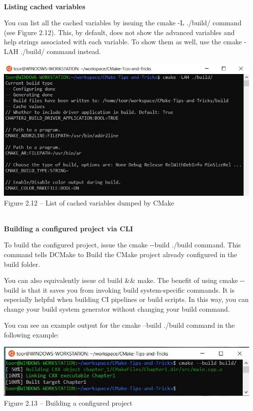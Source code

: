 \hspace*{\fill} \\ %
\noindent
\textbf{Listing cached variables}

You can list all the cached variables by issuing the cmake -L ./build/ command (see Figure 2.12). This, by default, does not show the advanced variables and help strings associated with each variable. To show them as well, use the cmake -LAH ./build/ command instead.

\begin{center}
\includegraphics[width=1.\textwidth]{content/1/chapter2/images/12.jpg}\\
Figure 2.12 – List of cached variables dumped by CMake
\end{center}

\hspace*{\fill} \\ %
\noindent
\textbf{Building a configured project via CLI}

To build the configured project, issue the cmake -{}-build ./build command. This command tells DCMake to Build the CMake project already configured in the build folder.

You can also equivalently issue cd build \&\& make. The benefit of using cmake -{}-build is that it saves you from invoking build system-specific commands. It is especially helpful when building CI pipelines or build scripts. In this way, you can change your build system generator without changing your build command.

You can see an example output for the cmake --build ./build command in the following example:

\begin{center}
\includegraphics[width=1.\textwidth]{content/1/chapter2/images/13.jpg}\\
Figure 2.13 – Building a configured project
\end{center}

